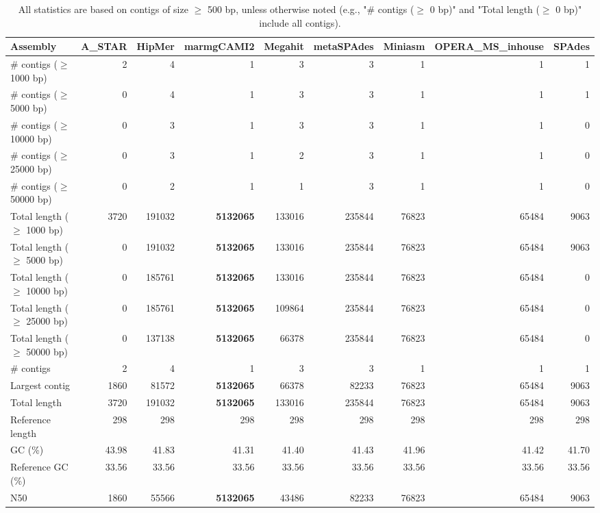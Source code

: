 \documentclass[12pt,a4paper]{article}
\begin{document}
\begin{table}[ht]
\begin{center}
\caption{All statistics are based on contigs of size $\geq$ 500 bp, unless otherwise noted (e.g., "\# contigs ($\geq$ 0 bp)" and "Total length ($\geq$ 0 bp)" include all contigs).}
\begin{tabular}{|l*{8}{|r}|}
\hline
Assembly & A\_STAR & HipMer & marmgCAMI2 & Megahit & metaSPAdes & Miniasm & OPERA\_MS\_inhouse & SPAdes \\ \hline
\# contigs ($\geq$ 1000 bp) & 2 & 4 & 1 & 3 & 3 & 1 & 1 & 1 \\ \hline
\# contigs ($\geq$ 5000 bp) & 0 & 4 & 1 & 3 & 3 & 1 & 1 & 1 \\ \hline
\# contigs ($\geq$ 10000 bp) & 0 & 3 & 1 & 3 & 3 & 1 & 1 & 0 \\ \hline
\# contigs ($\geq$ 25000 bp) & 0 & 3 & 1 & 2 & 3 & 1 & 1 & 0 \\ \hline
\# contigs ($\geq$ 50000 bp) & 0 & 2 & 1 & 1 & 3 & 1 & 1 & 0 \\ \hline
Total length ($\geq$ 1000 bp) & 3720 & 191032 & {\bf 5132065} & 133016 & 235844 & 76823 & 65484 & 9063 \\ \hline
Total length ($\geq$ 5000 bp) & 0 & 191032 & {\bf 5132065} & 133016 & 235844 & 76823 & 65484 & 9063 \\ \hline
Total length ($\geq$ 10000 bp) & 0 & 185761 & {\bf 5132065} & 133016 & 235844 & 76823 & 65484 & 0 \\ \hline
Total length ($\geq$ 25000 bp) & 0 & 185761 & {\bf 5132065} & 109864 & 235844 & 76823 & 65484 & 0 \\ \hline
Total length ($\geq$ 50000 bp) & 0 & 137138 & {\bf 5132065} & 66378 & 235844 & 76823 & 65484 & 0 \\ \hline
\# contigs & 2 & 4 & 1 & 3 & 3 & 1 & 1 & 1 \\ \hline
Largest contig & 1860 & 81572 & {\bf 5132065} & 66378 & 82233 & 76823 & 65484 & 9063 \\ \hline
Total length & 3720 & 191032 & {\bf 5132065} & 133016 & 235844 & 76823 & 65484 & 9063 \\ \hline
Reference length & 298 & 298 & 298 & 298 & 298 & 298 & 298 & 298 \\ \hline
GC (\%) & 43.98 & 41.83 & 41.31 & 41.40 & 41.43 & 41.96 & 41.42 & 41.70 \\ \hline
Reference GC (\%) & 33.56 & 33.56 & 33.56 & 33.56 & 33.56 & 33.56 & 33.56 & 33.56 \\ \hline
N50 & 1860 & 55566 & {\bf 5132065} & 43486 & 82233 & 76823 & 65484 & 9063 \\ \hline

\end{tabular}
\end{center}
\end{table}
\end{document}
